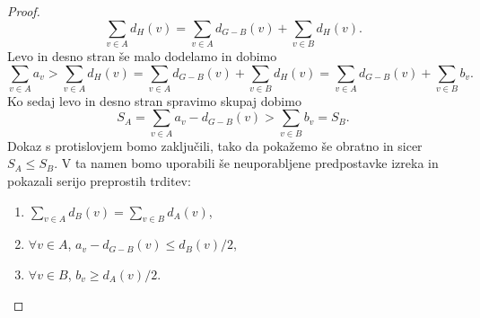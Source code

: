 \documentclass[12pt,a4paper,twoside]{article}
\theoremstyle{definition} %
\theoremstyle{plain} %
\numberwithin{equation}{section}  %
\begin{document}
\begin{proof}
$$\sum_{v \in A} d_H(v) = \sum_{v \in A} d_{G-B}(v) + \sum_{v \in B} d_H(v). $$
Levo in desno stran še malo dodelamo in dobimo
$$ \sum_{v\in A}a_v > \sum_{v \in A} d_H(v) = \sum_{v \in A} d_{G-B}(v) + \sum_{v \in B} d_H(v) =\sum_{v \in A} d_{G-B}(v) + \sum_{v \in B} b_v . $$
Ko sedaj levo in desno stran spravimo skupaj dobimo
$$ S_A = \sum_{v\in A}a_v - d_{G-B}(v) > \sum_{v \in B} b_v = S_B.$$
Dokaz s protislovjem bomo zaključili, tako da pokažemo še obratno in sicer $S_A \le S_B$. V ta namen bomo uporabili še neuporabljene predpostavke izreka in pokazali serijo preprostih trditev:

\begin{enumerate}
\item \label{fac:1} $\sum_ {v\in A}d_B(v) = \sum_{v \in B}d_A(v)$,
\item \label{fac:2} $\forall v \in A$,  $a_v - d_{G-B}(v) \le d_B(v)/2$,
\item  \label{fac:3} $\forall v \in B$,  $b_v \ge d_A(v)/2.$


\end{enumerate}
\end{proof}
\end{document}
